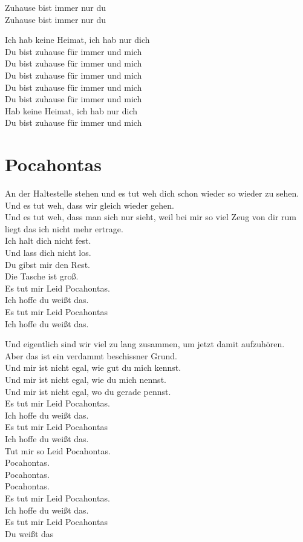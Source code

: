 \documentclass[]{book}
\begin{document}
Zuhause bist immer nur du\\
Zuhause bist immer nur du

Ich hab keine Heimat, ich hab nur dich\\
Du bist zuhause für immer und mich\\
Du bist zuhause für immer und mich\\
Du bist zuhause für immer und mich\\
Du bist zuhause für immer und mich\\
Du bist zuhause für immer und mich\\
Hab keine Heimat, ich hab nur dich\\
Du bist zuhause für immer und mich

\hypertarget{pocahontas}{%
\section{Pocahontas}\label{pocahontas}}

An der Haltestelle stehen und es tut weh dich schon wieder so wieder zu sehen.\\
Und es tut weh, dass wir gleich wieder gehen.\\
Und es tut weh, dass man sich nur sieht, weil bei mir so viel Zeug von dir rum liegt das ich nicht mehr ertrage.\\
Ich halt dich nicht fest.\\
Und lass dich nicht los.\\
Du gibst mir den Rest.\\
Die Tasche ist groß.\\
Es tut mir Leid Pocahontas.\\
Ich hoffe du weißt das.\\
Es tut mir Leid Pocahontas\\
Ich hoffe du weißt das.

Und eigentlich sind wir viel zu lang zusammen, um jetzt damit aufzuhören.\\
Aber das ist ein verdammt beschissner Grund.\\
Und mir ist nicht egal, wie gut du mich kennst.\\
Und mir ist nicht egal, wie du mich nennst.\\
Und mir ist nicht egal, wo du gerade pennst.\\
Es tut mir Leid Pocahontas.\\
Ich hoffe du weißt das.\\
Es tut mir Leid Pocahontas\\
Ich hoffe du weißt das.\\
Tut mir so Leid Pocahontas.\\
Pocahontas.\\
Pocahontas.\\
Pocahontas.\\
Es tut mir Leid Pocahontas.\\
Ich hoffe du weißt das.\\
Es tut mir Leid Pocahontas\\
Du weißt das
\end{document}

